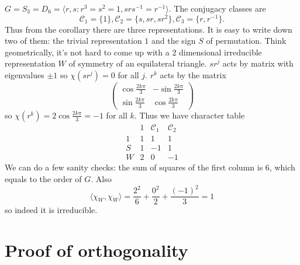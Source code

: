 \documentclass[a4paper]{article}
\newcommand{\ccl}{{\mathcal C}} %
\theoremstyle{definition}
\begin{document}
\begin{eg}
  \(G = S_3 = D_6 = \langle r, s: r^3 = s^2 = 1, srs^{-1} = r^{-1} \rangle\). The conjugacy classes are
  \[
    \ccl_1 = \{1\}, \ccl_2 = \{s, sr, sr^2\}, \ccl_3 = \{r, r^{-1}\}.
  \]
  Thus from the corollary there are three representations. It is easy to write down two of them: the trivial representation \(1\) and the sign \(S\) of permutation. Think geometrically, it's not hard to come up with a \(2\) dimensional irreducible representation \(W\) of symmetry of an equilateral triangle. \(sr^j\) acts by matrix with eigenvalues \(\pm 1\) so \(\chi(sr^j) = 0\) for all \(j\). \(r^k\) acts by the matrix
  \[
    \begin{pmatrix}
      \cos \frac{2k\pi}{3} & - \sin \frac{2k\pi}{3} \\
      \sin \frac{2k\pi}{3} & \cos \frac{2k\pi}{3}
    \end{pmatrix}
  \]
  so \(\chi(r^k) = 2 \cos \frac{2k\pi}{3} = - 1\) for all \(k\). Thus we have character table
  \[
    \begin{array}{c|ccc}
      & 1 & \ccl_1 & \ccl_2 \\ \hline
      1 & 1 & 1 & 1 \\
      S & 1 & -1 & 1 \\
      W & 2 & 0 & -1
    \end{array}
  \]
  We can do a few sanity checks: the sum of squares of the first column is \(6\), which equals to the order of \(G\). Also
  \[
    \langle \chi_W, \chi_W \rangle
    = \frac{2^2}{6} + \frac{0^2}{2} + \frac{(-1)^2}{3}
    = 1
  \]
  so indeed it is irreducible.
\end{eg}

\section{Proof of orthogonality}

\end{document}
